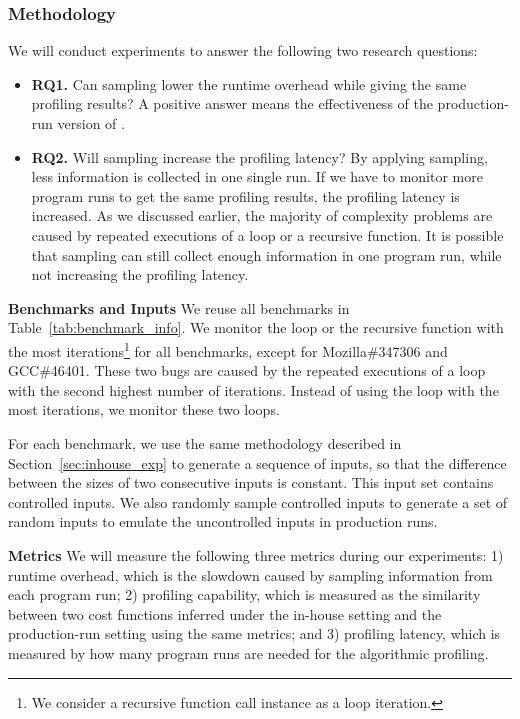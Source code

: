 \subsubsection{Methodology}
We will conduct experiments to answer the following two research questions:

\begin{itemize}
\item {\bf RQ1.} 
Can sampling lower the runtime overhead while giving the same profiling results? 
A positive answer means the effectiveness of the production-run version of \Tool. 

\item {\bf RQ2.} 
Will sampling increase the profiling latency? 
By applying sampling, less information is collected in one single run. 
If we have to monitor more program runs to get the same profiling results,
the profiling latency is increased.
As we discussed earlier, the majority of complexity problems are caused 
by repeated executions of a loop or a recursive function.
It is possible that sampling can still collect enough information in one program run, 
while not increasing the profiling latency. 


\end{itemize}

\noindent\textbf{Benchmarks and Inputs}
We reuse all benchmarks in Table~\ref{tab:benchmark_info}.
We monitor the loop or the recursive function with the most iterations\footnote{We consider a recursive function call instance as a loop iteration.} 
for all benchmarks,
except for Mozilla\#347306 and GCC\#46401. 
These two bugs are caused by the repeated executions of a loop with the second
highest number of iterations. Instead of using the loop with the most iterations,
we monitor these two loops.


For each benchmark, 
we use the same methodology described in Section~\ref{sec:inhouse_exp} 
to generate a sequence of inputs, 
so that the difference between the sizes of two consecutive inputs is constant.
This input set contains controlled inputs.
We also randomly sample controlled inputs to generate a set of random 
inputs to emulate the uncontrolled inputs in production runs.    

\noindent\textbf{Metrics}
We will measure the following three metrics during our experiments:
1) runtime overhead, which is the slowdown caused 
by sampling information from each program run;
2) profiling capability, which is measured as the similarity between two cost functions 
inferred under the in-house setting and the production-run setting using the same metrics;
and 3) profiling latency, which is measured by how many program 
runs are needed for the algorithmic profiling. 


